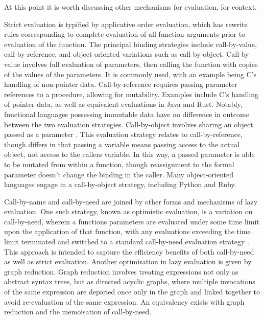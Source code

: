 \documentclass[10pt,a4paper]{article}
\begin{document}
At this point it is worth discussing other mechanisms for evaluation, for context.

Strict evaluation is typified by applicative order evaluation, which has rewrite rules corresponding to complete evaluation of all function arguments prior to evaluation of the function\cite{abelson1996sicp:order}.
The principal binding strategies include call-by-value, call-by-reference, and object-oriented variations such as call-by-object.
Call-by-value involves full evaluation of parameters, then calling the function with copies of the values of the parameters\cite{plotkin1975callnameval}.
It is commonly used, with an example being C's handling of non-pointer data.
Call-by-reference requires passing parameter references to a procedure, allowing for mutability\cite{turbak2008design}.
Examples include C's handling of pointer data, as well as equivalent evaluations in Java and Rust.
Notably, functional languages possessing immutable data have no difference in outcome between the two evaluation strategies.
Call-by-object involves sharing an object passed as a parameter \cite{liskov1979clu}.
This evaluation strategy relates to call-by-reference, though differs in that passing a variable means passing access to the actual object, not access to the callers variable.
In this way, a passed parameter is able to be mutated from within a function, though reassignment to the formal parameter doesn't change the binding in the caller.
Many object-oriented languages engage in a call-by-object strategy, including Python and Ruby.

Call-by-name and call-by-need are joined by other forms and mechanisms of lazy evaluation.
One such strategy, known as optimistic evaluation, is a variation on call-by-need, wherein a functions parameters are evaluated under some time limit upon the application of that function, with any evaluations exceeding the time limit terminated and switched to a standard call-by-need evaluation strategy \cite{ennals2003optimistic}.
This approach is intended to capture the efficiency benefits of both call-by-need as well as strict evaluation.
Another optimisation in lazy evaluation is given by graph reduction.
Graph reduction involves treating expressions not only as abstract syntax trees, but as directed acyclic graphs, where multiple invocations of the same expression are depicted once only in the graph and linked together to avoid re-evaluation of the same expression\cite{hudak1989functional}.
An equivalency exists with graph reduction and the memoisation of call-by-need.
\end{document}
